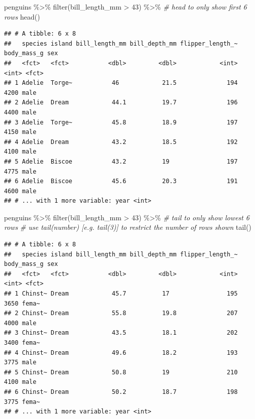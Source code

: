 \documentclass[
]{article}
\newenvironment{Shaded}{\begin{snugshade}}{\end{snugshade}}
\newcommand{\CommentTok}[1]{\textcolor[rgb]{0.56,0.35,0.01}{\textit{#1}}}
\newcommand{\FunctionTok}[1]{\textcolor[rgb]{0.00,0.00,0.00}{#1}}
\newcommand{\NormalTok}[1]{#1}
\newcommand{\SpecialCharTok}[1]{\textcolor[rgb]{0.00,0.00,0.00}{#1}}
\newcommand{\StringTok}[1]{\textcolor[rgb]{0.31,0.60,0.02}{#1}}
\begin{document}
\begin{Shaded}
\begin{Highlighting}[]
\NormalTok{penguins }\SpecialCharTok{\%\textgreater{}\%} 
  \FunctionTok{filter}\NormalTok{(bill\_length\_mm }\SpecialCharTok{\textgreater{}} \StringTok{\textquotesingle{}43\textquotesingle{}}\NormalTok{) }\SpecialCharTok{\%\textgreater{}\%} 
\CommentTok{\# head to only show first 6 rows}
  \FunctionTok{head}\NormalTok{()}
\end{Highlighting}
\end{Shaded}

\begin{verbatim}
## # A tibble: 6 x 8
##   species island bill_length_mm bill_depth_mm flipper_length_~ body_mass_g sex  
##   <fct>   <fct>           <dbl>         <dbl>            <int>       <int> <fct>
## 1 Adelie  Torge~           46            21.5              194        4200 male 
## 2 Adelie  Dream            44.1          19.7              196        4400 male 
## 3 Adelie  Torge~           45.8          18.9              197        4150 male 
## 4 Adelie  Dream            43.2          18.5              192        4100 male 
## 5 Adelie  Biscoe           43.2          19                197        4775 male 
## 6 Adelie  Biscoe           45.6          20.3              191        4600 male 
## # ... with 1 more variable: year <int>
\end{verbatim}

\begin{Shaded}
\begin{Highlighting}[]
\NormalTok{penguins }\SpecialCharTok{\%\textgreater{}\%} 
  \FunctionTok{filter}\NormalTok{(bill\_length\_mm }\SpecialCharTok{\textgreater{}} \StringTok{\textquotesingle{}43\textquotesingle{}}\NormalTok{) }\SpecialCharTok{\%\textgreater{}\%} 
\CommentTok{\# tail to only show lowest 6 rows  }
\CommentTok{\# use tail(number) [e.g. tail(3)] to restrict the number of rows shown}
  \FunctionTok{tail}\NormalTok{()}
\end{Highlighting}
\end{Shaded}

\begin{verbatim}
## # A tibble: 6 x 8
##   species island bill_length_mm bill_depth_mm flipper_length_~ body_mass_g sex  
##   <fct>   <fct>           <dbl>         <dbl>            <int>       <int> <fct>
## 1 Chinst~ Dream            45.7          17                195        3650 fema~
## 2 Chinst~ Dream            55.8          19.8              207        4000 male 
## 3 Chinst~ Dream            43.5          18.1              202        3400 fema~
## 4 Chinst~ Dream            49.6          18.2              193        3775 male 
## 5 Chinst~ Dream            50.8          19                210        4100 male 
## 6 Chinst~ Dream            50.2          18.7              198        3775 fema~
## # ... with 1 more variable: year <int>
\end{verbatim}
\end{document}
